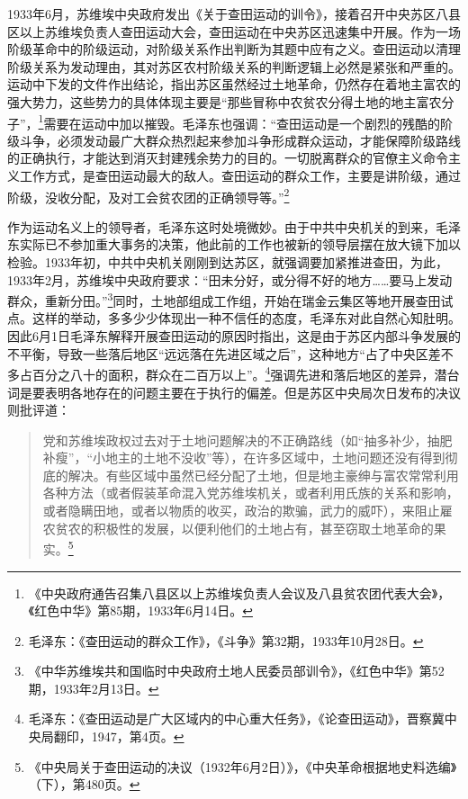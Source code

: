 1933年6月，苏维埃中央政府发出《关于查田运动的训令》，接着召开中央苏区八县区以上苏维埃负责人查田运动大会，查田运动在中央苏区迅速集中开展。作为一场阶级革命中的阶级运动，对阶级关系作出判断为其题中应有之义。查田运动以清理阶级关系为发动理由，其对苏区农村阶级关系的判断逻辑上必然是紧张和严重的。运动中下发的文件作出结论，指出苏区虽然经过土地革命，仍然存在着地主富农的强大势力，这些势力的具体体现主要是“那些冒称中农贫农分得土地的地主富农分子”，\footnote{《中央政府通告召集八县区以上苏维埃负责人会议及八县贫农团代表大会》，《红色中华》第85期，1933年6月14日。}需要在运动中加以摧毁。毛泽东也强调：“查田运动是一个剧烈的残酷的阶级斗争，必须发动最广大群众热烈起来参加斗争形成群众运动，才能保障阶级路线的正确执行，才能达到消灭封建残余势力的目的。一切脱离群众的官僚主义命令主义工作方式，是查田运动最大的敌人。查田运动的群众工作，主要是讲阶级，通过阶级，没收分配，及对工会贫农团的正确领导等。”\footnote{毛泽东：《查田运动的群众工作》，《斗争》第32期，1933年10月28日。}


作为运动名义上的领导者，毛泽东这时处境微妙。由于中共中央机关的到来，毛泽东实际已不参加重大事务的决策，他此前的工作也被新的领导层摆在放大镜下加以检验。1933年初，中共中央机关刚刚到达苏区，就强调要加紧推进查田，为此，1933年2月，苏维埃中央政府要求：“田未分好，或分得不好的地方……要马上发动群众，重新分田。”\footnote{《中华苏维埃共和国临时中央政府土地人民委员部训令》，《红色中华》第52期，1933年2月13日。}同时，土地部组成工作组，开始在瑞金云集区等地开展查田试点。这样的举动，多多少少体现出一种不信任的态度，毛泽东对此自然心知肚明。因此6月1日毛泽东解释开展查田运动的原因时指出，这是由于苏区内部斗争发展的不平衡，导致一些落后地区“远远落在先进区域之后”，这种地方“占了中央区差不多占百分之八十的面积，群众在二百万以上”。\footnote{毛泽东：《查田运动是广大区域内的中心重大任务》，《论查田运动》，晋察冀中央局翻印，1947，第4页。}强调先进和落后地区的差异，潜台词是要表明各地存在的问题主要在于执行的偏差。但是苏区中央局次日发布的决议则批评道：

\begin{quote}

党和苏维埃政权过去对于土地问题解决的不正确路线（如“抽多补少，抽肥补瘦”，“小地主的土地不没收”等），在许多区域中，土地问题还没有得到彻底的解决。有些区域中虽然已经分配了土地，但是地主豪绅与富农常常利用各种方法（或者假装革命混入党苏维埃机关，或者利用氏族的关系和影响，或者隐瞒田地，或者以物质的收买，政治的欺骗，武力的威吓），来阻止雇农贫农的积极性的发展，以便利他们的土地占有，甚至窃取土地革命的果实。\footnote{《中央局关于查田运动的决议（1932年6月2日）》，《中央革命根据地史料选编》（下），第480页。}
\end{quote}


